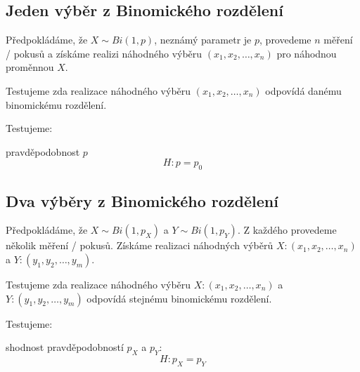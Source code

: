 \subsection{Jeden výběr z Binomického rozdělení}

\begin{compactitem}
    \item Předpokládáme, že $X \sim Bi(1, p)$, neznámý parametr je $p$, provedeme $n$  měření / pokusů a získáme realizi náhodného výběru $(x_1, x_2, \ldots, x_n)$ pro náhodnou proměnnou $X$.

    \item Testujeme zda realizace náhodného výběru $(x_1, x_2, \ldots, x_n)$ odpovídá danému binomickému rozdělení.

    \item Testujeme: \begin{compactitem}
        \item pravděpodobnost $p$
        $$ H : p = p_0 $$
    \end{compactitem}
\end{compactitem}

\subsection{Dva výběry z Binomického rozdělení}

\begin{compactitem}
    \item Předpokládáme, že $X \sim Bi(1, p_X)$ a $Y \sim Bi(1, p_Y)$. Z každého provedeme několik měření / pokusů. Získáme realizaci náhodných výběrů $X: (x_1, x_2, \ldots, x_n)$ a $Y: (y_1, y_2, \ldots, y_m)$.

    \item Testujeme zda realizace náhodného výběru $X : (x_1, x_2, \ldots, x_n)$ a $Y: (y_1, y_2, \ldots, y_m)$ odpovídá stejnému binomickému rozdělení.

    \item Testujeme: \begin{compactitem}
        \item shodnost pravděpodobností $p_X$ a $p_Y$:
        $$ H : p_X = p_Y $$
    \end{compactitem}
\end{compactitem}
